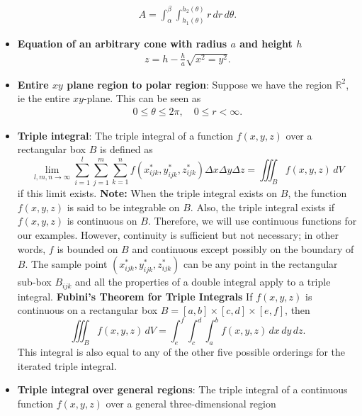 \documentclass{report}
\begin{document}
\begin{itemize}
            \begin{align*}
                A = \int_{\alpha}^{\beta}\int_{h_{1}(\theta )}^{h_{2}(\theta )}r\, dr\, d\theta 
            .\end{align*}
        \item \textbf{Equation of an arbitrary cone with radius $a$ and height $h$}
            \begin{align*}
                z = h - \frac{h}{a}\sqrt{x^{2} = y^{2}}
            .\end{align*}
        \item \textbf{Entire $xy$ plane region to polar region}: Suppose we have the region $\mathbb{R}^{2}$, ie the entire $xy$-plane. This can be seen as
            \begin{align*}
                0 \leq \theta  \leq 2\pi, \quad 0 \leq r < \infty
            .\end{align*}
        \item \textbf{Triple integral}:
            The triple integral of a function $f(x,y,z)$ over a rectangular box $B$ is defined as
            \[
                \lim_{l,m,n \to \infty} \sum_{i=1}^{l} \sum_{j=1}^{m} \sum_{k=1}^{n} f(x^*_{ijk}, y^*_{ijk}, z^*_{ijk}) \Delta x \Delta y \Delta z = \iiint_B f(x,y,z) \, dV
            \]
            if this limit exists. 
            \bigbreak \noindent 
            \textbf{Note:} When the triple integral exists on $B$, the function $f(x,y,z)$ is said to be integrable on $B$. Also, the triple integral exists if $f(x,y,z)$ is continuous on $B$. Therefore, we will use continuous functions for our examples. However, continuity is sufficient but not necessary; in other words, $f$ is bounded on $B$ and continuous except possibly on the boundary of $B$.
            \bigbreak \noindent 
            The sample point $(x^*_{ijk}, y^*_{ijk}, z^*_{ijk})$ can be any point in the rectangular sub-box $B_{ijk}$ and all the properties of a double integral apply to a triple integral.
            \textbf{Fubini's Theorem for Triple Integrals}
            If $f(x,y,z)$ is continuous on a rectangular box $B = [a,b] \times [c,d] \times [e,f]$, then
            \[
                \iiint_B f(x,y,z) \, dV = \int_e^f \int_c^d \int_a^b f(x,y,z) \, dx \, dy \, dz.
            \]
            This integral is also equal to any of the other five possible orderings for the iterated triple integral.
        \item \textbf{Triple integral over general regions}:
            The triple integral of a continuous function $f(x,y,z)$ over a general three-dimensional region

\end{itemize}
\end{document}

